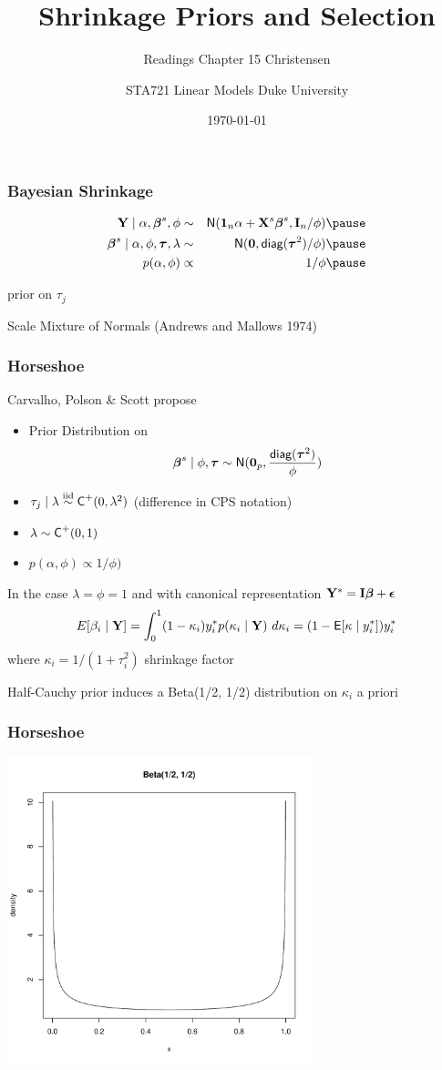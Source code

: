 \documentclass[]{beamer}
\title{Shrinkage Priors and Selection}
\subtitle{Readings Chapter 15 Christensen}
\institute{Merlise Clyde}
\author{STA721 Linear Models Duke University}
\date{\today}
\begin{document}
\maketitle
\begin{frame}
  \frametitle{Bayesian Shrinkage}
  \begin{eqnarray*}
    \Y \mid \alpha, \b^s, \phi & \sim & \N(\one_n \alpha + \X^s \b^s, \I_n/\phi)  \pause\\
    \b^s \mid \alpha, \phi, \taub, \lambda & \sim & \N(\zero, \diag(\taub^2)/\phi)  \pause\\
    p(\alpha, \phi) & \propto& 1/\phi  \pause\\
  \end{eqnarray*}

prior on $\tau_j$ \pause

Scale Mixture of Normals  (Andrews and Mallows 1974)
\end{frame}




\begin{frame}
  \frametitle{Horseshoe}
  Carvalho, Polson \& Scott  propose
\begin{itemize}
\item
Prior Distribution on $$\boldsymbol{\beta}^s \mid \phi, \boldsymbol{\tau} \sim \textsf{N}(\mathbf{0}_p, \frac{\textsf{diag}(\boldsymbol{\tau}^2)}{ \phi
    }) $$ \pause
\item $\tau_j \mid \lambda \mathrel{\mathop{\sim}\limits^{\rm iid}} \textsf{C}^+(0, \lambda^2)$   (difference in CPS notation) \pause
\item $\lambda \sim \textsf{C}^+(0, 1)$ \pause
\item $p(\alpha, \phi) \propto 1/\phi)$ \pause
\end{itemize}

In the case $\lambda = \phi = 1$ and with canonical representation $\mathbf{Y}^* =
\mathbf{I} \boldsymbol{\beta} + \boldsymbol{\epsilon}$ \pause
$$
E[\beta_i \mid \mathbf{Y}] = \int_0^1 (1 - \kappa_i) y^*_i p(\kappa_i \mid \mathbf{Y})
\ d\kappa_i = (1 - \textsf{E}[\kappa \mid y^*_i]) y^*_i$$
where $\kappa_i = 1/(1 + \tau_i^2)$ shrinkage factor \pause

\vspace{18pt}
Half-Cauchy prior induces a Beta(1/2, 1/2) distribution on $\kappa_i$
a priori
\end{frame}


\begin{frame} \frametitle{Horseshoe}
  \includegraphics[height=3.5in]{beta}
\end{frame}
\end{document}
